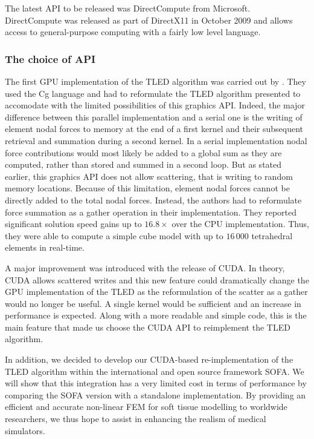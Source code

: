The latest API to be released was DirectCompute from Microsoft. DirectCompute was released as part of DirectX11 in October 2009 and allows access to general-purpose computing with a fairly low level language. 

		
	\subsubsection*{The choice of API}	
The first GPU implementation	of the TLED algorithm was carried out by \cite{Taylor07b,Taylor08}. They used the Cg language and had to reformulate the TLED algorithm presented to accomodate with the limited possibilities of this graphics API. Indeed, the major difference between this parallel implementation and a serial one is the writing of element nodal forces to memory at the end of a first kernel and their subsequent retrieval and summation during a second kernel. In a serial implementation nodal force contributions would most likely be added to a global sum as they are computed, rather than stored and summed in a second loop. But as stated earlier, this graphics API does not allow scattering, that is writing to random memory locations. Because of this limitation, element nodal forces cannot be directly added to the total nodal forces. Instead, the authors had to reformulate force summation as a gather operation in their implementation. They reported significant solution speed gains up to $ 16.8 \times$ over the CPU implementation. Thus, they were able to compute a simple cube model with up to $ 16\,000 $ tetrahedral elements in real-time. 

A major improvement was introduced with the release of CUDA. In theory, CUDA allows scattered writes and this new feature could dramatically change the GPU implementation of the TLED as the reformulation of the scatter as a gather would no longer be useful. A single kernel would be sufficient and an increase in performance is expected. Along with a more readable and simple code, this is the main feature that made us choose the CUDA API to reimplement the TLED algorithm.

In addition, we decided to develop our CUDA-based re-implementation of the TLED algorithm within the international and open source framework SOFA. We will show that this integration has a very limited cost in terms of performance by comparing the SOFA version with a standalone implementation. By providing an efficient and accurate non-linear FEM for soft tissue modelling to worldwide researchers, we thus hope to assist in enhancing the realism of medical simulators.
	
